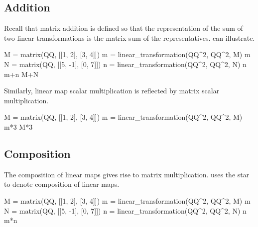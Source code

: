 \subsection{Addition}
Recall that matrix addition is defined so that the representation of
the sum of two linear transformations is the matrix sum of the representatives.
\Sage{} can illustrate.
\begin{sageoutput}
M = matrix(QQ, [[1, 2], [3, 4]])
m = linear_transformation(QQ^2, QQ^2, M)
m
N = matrix(QQ, [[5, -1], [0, 7]])
n = linear_transformation(QQ^2, QQ^2, N)
n
m+n
M+N
\end{sageoutput}
\noindent Similarly, linear map scalar multiplication is reflected by 
matrix scalar multiplication.
\begin{sageoutput}[d,0,2]
M = matrix(QQ, [[1, 2], [3, 4]])
m = linear_transformation(QQ^2, QQ^2, M)
m*3
M*3  
\end{sageoutput}



\subsection{Composition}
The composition of linear maps gives rise to matrix multiplication.
\Sage{} uses the star \inlinecode{*} to denote composition of linear maps.
\begin{sageoutput}
M = matrix(QQ, [[1, 2], [3, 4]])
m = linear_transformation(QQ^2, QQ^2, M)
m
N = matrix(QQ, [[5, -1], [0, 7]])
n = linear_transformation(QQ^2, QQ^2, N)
n
m*n
\end{sageoutput}

